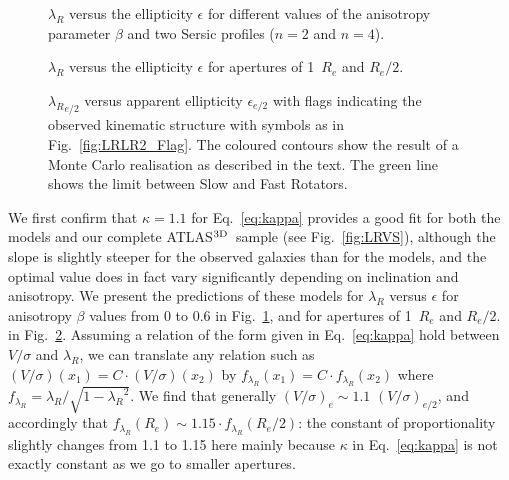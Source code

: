 \documentclass[useAMS,usenatbib,usegraphicx]{mn2e}
\newcommand{\atlas}{{ATLAS$^{\rm 3D}$}}
\begin{document}
\begin{figure}
\centering
{}
\caption{$\lambda_R$ versus the ellipticity $\epsilon$ for different values of
the anisotropy parameter $\beta$ and two Sersic profiles ($n=2$ and $n=4$).}
\label{fig:LREPS_aniso}
\end{figure}

\begin{figure}
\centering
{}
\caption{$\lambda_R$ versus the ellipticity $\epsilon$ for apertures of 1~$R_e$
and $R_e / 2$.}
\label{fig:LREPS_Re}
\end{figure}
\begin{figure}
\centering
{}
\caption{${\lambda_R}_{e/2}$ versus apparent ellipticity $\epsilon_{e/2}$ with flags
indicating the observed kinematic structure with symbols as in Fig.~\ref{fig:LRLR2_Flag}. The coloured
contours show the result of a Monte Carlo realisation as described in the text.
The green line shows the limit between Slow and Fast Rotators.}
\label{fig:LR2Eps2_MC}
\end{figure}
We first confirm that $\kappa = 1.1$ for Eq.~\ref{eq:kappa} provides a good fit for both
the models and our complete \atlas\ sample (see Fig.~\ref{fig:LRVS}), although
the slope is slightly steeper for the observed galaxies than for the models, and
the optimal value does in fact vary significantly depending on inclination and
anisotropy. We present the predictions of these models for $\lambda_R$ versus $\epsilon$ for
anisotropy $\beta$ values from 0 to 0.6 in Fig.~\ref{fig:LREPS_aniso}, and for
apertures of 1~$R_e$ and $R_e / 2$. in Fig.~\ref{fig:LREPS_Re}.
Assuming a relation of the form given in Eq.~\ref{eq:kappa}
hold between $V/\sigma$ and $\lambda_R$, we can translate any relation such as 
$\left( V/\sigma \right)(x_1) = C \cdot \left( V/\sigma \right)(x_2)$
by $f_{\lambda_R}(x_1) = C \cdot f_{\lambda_R}(x_2)$ where $f_{\lambda_R} = \lambda_R /
\sqrt{ 1 - {\lambda_R}^2 }$.
We find that generally ${\left(V/\sigma\right)}_e \sim 1.1 \,\, {\left(V/\sigma\right)}_{e/2}$, and
accordingly that $f_{\lambda_R}(R_e) \sim 1.15 \cdot f_{\lambda_R}(R_e/2)$: the
constant of proportionality slightly changes from 1.1 to 1.15 here mainly because
$\kappa$ in Eq.~\ref{eq:kappa} is not exactly constant as we go to smaller apertures.
\end{document}
